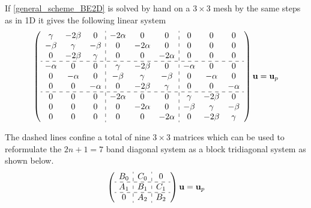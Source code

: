 \noindent If \eqref{general_scheme_BE2D} is solved by hand on a $3\times3$ mesh by the same steps as in 1D it gives the following linear system
\begin{align}\label{linear_system_BE2D}
  \left(\begin{array}{c c c : c c c : c c c}
        \gamma & -2\beta &0 &-2\alpha &0 &0 &0 &0 &0\\
        -\beta & \gamma & -\beta &0 &-2\alpha &0 &0 &0 &0\\
        0&-2\beta & \gamma & 0 & 0 & -2\alpha &0&0&0\\ \hdashline
        -\alpha& 0&0 & \gamma & -2\beta & 0 & -\alpha &0&0\\
        0& -\alpha&0&-\beta & \gamma & -\beta & 0 & -\alpha &0\\
        0& 0& -\alpha&0&-2\beta & \gamma & 0 & 0 &-\alpha\\ \hdashline
        0& 0 &0 &-2\alpha &0&0 & \gamma & -2\beta&0\\
        0& 0 &0 &0 &-2\alpha&0&-\beta & \gamma &-\beta\\
         0&0 &0 &0&0 &-2\alpha&0&-2\beta & \gamma
       \end{array}\right)\mathbf{u} = \mathbf{u}_p
\end{align}

\noindent The dashed lines confine a total of nine $3\times 3$ matrices which can be used to reformulate the $2n +1 = 7$ band diagonal system as a block tridiagonal system as shown below.
\begin{align}\label{block_tridiagonal_dashed}
 \left(\begin{array}{c : c : c }
        B_0 & C_0 &0  \\ \hdashline
        A_1 & B_1 & C_1 \\ \hdashline
        0& A_2 & B_2
       \end{array}\right)\mathbf{u} = \mathbf{u}_p
\end{align}

